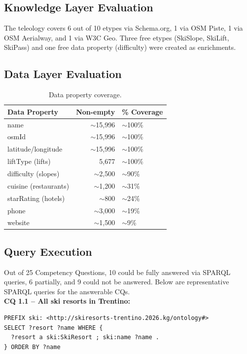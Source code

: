 \subsection{Knowledge Layer Evaluation}

The teleology covers 6 out of 10 etypes via Schema.org, 1 via OSM Piste, 1 via OSM Aerialway, and 1 via W3C Geo. Three free etypes (SkiSlope, SkiLift, SkiPass) and one free data property (difficulty) were created as enrichments.

\subsection{Data Layer Evaluation}

\begin{table}[h!]
\centering
\small
\begin{tabular}{|l|r|l|}
\hline
\textbf{Data Property} & \textbf{Non-empty} & \textbf{\% Coverage} \\
\hline
name & $\sim$15,996 & $\sim$100\% \\
osmId & $\sim$15,996 & $\sim$100\% \\
latitude/longitude & $\sim$15,996 & $\sim$100\% \\
liftType (lifts) & 5,677 & $\sim$100\% \\
difficulty (slopes) & $\sim$2,500 & $\sim$90\% \\
cuisine (restaurants) & $\sim$1,200 & $\sim$31\% \\
starRating (hotels) & $\sim$800 & $\sim$24\% \\
phone & $\sim$3,000 & $\sim$19\% \\
website & $\sim$1,500 & $\sim$9\% \\
\hline
\end{tabular}
\caption{Data property coverage.}
\end{table}

\subsection{Query Execution}

Out of 25 Competency Questions, 10 could be fully answered via SPARQL queries, 6 partially, and 9 could not be answered. Below are representative SPARQL queries for the answerable CQs.\\

\noindent\textbf{CQ 1.1 -- All ski resorts in Trentino:}
\begin{verbatim}
PREFIX ski: <http://skiresorts-trentino.2026.kg/ontology#>
SELECT ?resort ?name WHERE {
  ?resort a ski:SkiResort ; ski:name ?name .
} ORDER BY ?name
\end{verbatim}


